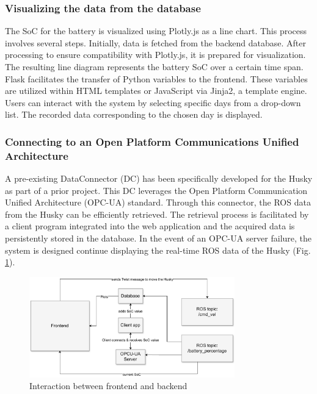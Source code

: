 \documentclass[conference]{IEEEtran}
\begin{document}
\subsubsection{Visualizing the data from the database}
The SoC for the battery is visualized using Plotly.js as a line chart. This process involves several steps. Initially, data is fetched from the backend database. After processing to ensure compatibility with Plotly.js, it is prepared for visualization. The resulting line diagram represents the battery SoC over a certain time span. Flask facilitates the transfer of Python variables to the frontend. 
These variables are utilized within HTML templates or JavaScript via Jinja2, a template engine. Users can interact with the system by selecting specific days from a drop-down list. The recorded data corresponding to the chosen day is displayed.
\subsubsection{Connecting to an Open Platform Communications Unified Architecture}
A pre-existing DataConnector (DC) has been specifically developed for the Husky as part of a prior project. This DC leverages the Open Platform Communication Unified Architecture (OPC-UA) standard. Through this connector, the ROS data from the Husky can be efficiently retrieved. The retrieval process is facilitated by a client program integrated into the web application and the acquired data is persistently stored in the database. 
In the event of an OPC-UA server failure, the system is designed continue displaying the real-time ROS data of the Husky (Fig. \ref{fig:backfront}).
\begin{figure}[bp]
    \centerline{\includegraphics[width=8.9cm]{Pictures/backfront.pdf}}
    \caption{Interaction between frontend and backend}
    \label{fig:backfront}
\end{figure}
\end{document}
